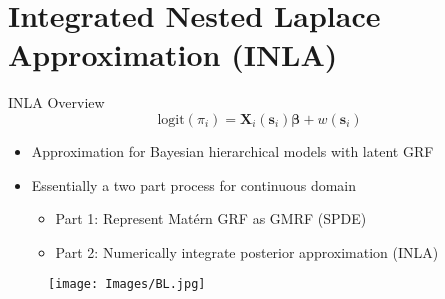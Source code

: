 \documentclass{beamer}
\begin{document}
% 
% 
% 

\section{Integrated Nested Laplace Approximation (INLA)}

\begin{frame}{INLA Overview}
$$ \text{logit}(\pi_{i}) = \pmb{X}_{i}(\pmb{s}_{i})\pmb{\beta} + w(\pmb{s}_{i}) $$
\begin{itemize}
\addtolength{\itemsep}{0.5\baselineskip}
\item Approximation for Bayesian hierarchical models with latent GRF
\item Essentially a two part process for continuous domain
  \begin{itemize}
  \addtolength{\itemsep}{0.5\baselineskip}
  \item Part 1: Represent Mat\'ern GRF as GMRF (SPDE)
  \item Part 2: Numerically integrate posterior approximation (INLA)
  \end{itemize}
\end{itemize}
  \begin{figure}[H]
	\centering
	\texttt{[image: Images/BL.jpg]}
	\end{figure}
\end{frame}
\end{document}
